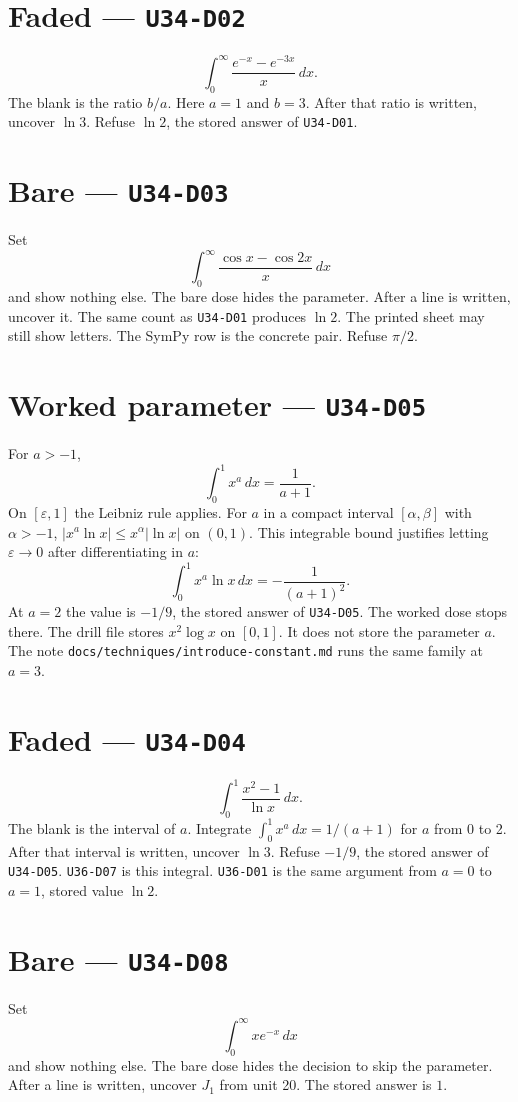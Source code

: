 \section{Faded --- \texttt{U34-D02}}
\[
\int_0^\infty\frac{e^{-x}-e^{-3x}}{x}\,dx.
\]
The blank is the ratio $b/a$. Here $a=1$ and $b=3$. After that ratio is written, uncover $\ln 3$. Refuse $\ln 2$, the stored answer of \texttt{U34-D01}.

\section{Bare --- \texttt{U34-D03}}
Set
\[
\int_0^\infty\frac{\cos x-\cos 2x}{x}\,dx
\]
and show nothing else. The bare dose hides the parameter. After a line is written, uncover it. The same count as \texttt{U34-D01} produces $\ln 2$. The printed sheet may still show letters. The SymPy row is the concrete pair. Refuse $\pi/2$.

\section{Worked parameter --- \texttt{U34-D05}}
For $a>-1$,
\[
\int_0^1 x^a\,dx=\frac{1}{a+1}.
\]
On $[\varepsilon,1]$ the Leibniz rule applies. For $a$ in a compact interval $[\alpha,\beta]$ with $\alpha>-1$, $|x^a\ln x|\le x^\alpha|\ln x|$ on $(0,1)$. This integrable bound justifies letting $\varepsilon\to0$ after differentiating in $a$:
\[
\int_0^1 x^a\ln x\,dx=-\frac{1}{(a+1)^2}.
\]
At $a=2$ the value is $-1/9$, the stored answer of \texttt{U34-D05}. The worked dose stops there.
The drill file stores $x^2\log x$ on $[0,1]$. It does not store the parameter $a$. The note \texttt{docs/techniques/introduce-constant.md} runs the same family at $a=3$.

\section{Faded --- \texttt{U34-D04}}
\[
\int_0^1\frac{x^2-1}{\ln x}\,dx.
\]
The blank is the interval of $a$. Integrate $\int_0^1 x^a\,dx=1/(a+1)$ for $a$ from 0 to 2. After that interval is written, uncover $\ln 3$. Refuse $-1/9$, the stored answer of \texttt{U34-D05}. \texttt{U36-D07} is this integral. \texttt{U36-D01} is the same argument from $a=0$ to $a=1$, stored value $\ln 2$.

\section{Bare --- \texttt{U34-D08}}
Set
\[
\int_0^\infty x e^{-x}\,dx
\]
and show nothing else. The bare dose hides the decision to skip the parameter. After a line is written, uncover $J_1$ from unit 20. The stored answer is $1$.

